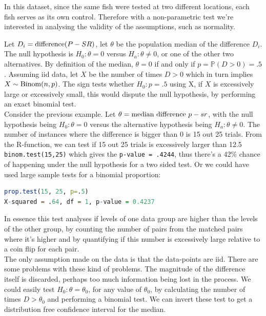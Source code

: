 \documentclass{homework}
\begin{document}
In this dataset, since the same fish were tested at two different locations, each fish serves as its own control. Therefore with a non-parametric test we're interested in analysing the validity of the assumptions, such as normality. 

Let $D_i = \textnormal{difference} (P-SR)$, let $\theta$ be the population median of the difference $D_i$. The null hypothesis is $H_0: \theta = 0$ versus $H_a: \theta \neq 0$, or one of the other two alternatives. By definition of the median, $\theta=0$ if and only if $p = \mathds{P}(D>0)=.5$.
Assuming iid data, let $X$ be the number of times $D>0$ which in turn implies $X\sim \textnormal{Binom}(n,p)$. The sign tests whether $H_0: p=.5$ using X, if $X$ is excessively large or excessively small, this would dispute the null hypothesis, by performing an exact binomial test.\\

Consider the previous example. Let $\theta = \textnormal{median difference } p - sr$, with the null hypothesis being $H_0: \theta = 0$ versus the alternative hypothesis being  $H_a: \theta \neq 0$. The number of instances where the difference is bigger than 0 is 15 out 25 trials. From the R-function, we can test if 15 out 25 trials is excessively larger than 12.5 \texttt{binom.test(15,25)} which gives the \texttt{p-value = .4244}, thus there's a 42\% chance of happening under the null hypothesis for a two sided test. Or we could have used large sample tests for a binomial proportion:

\begin{lstlisting}[language=R]
prop.test(15, 25, p=.5)
X-squared = .64, df = 1, p-value = 0.4237
\end{lstlisting}

In essence this test analyses if levels of one data group are higher than the levels of the other group, by counting the number of pairs from the matched pairs where it's higher and by quantifying if this number is excessively large relative to a coin flip for each pair.\\

The only assumption made on the data is that the data-points are iid. There are some problems with these kind of problems. The magnitude of the difference itself is discarded, perhaps too much information being lost in the process. 
We could easily test $H_0: \theta=\theta_0$, for any value of $\theta_0$, by calculating the number of times $D>\theta_0$ and performing a binomial test. We can invert these test to get a distribution free confidence interval for the median. 
\end{document}
